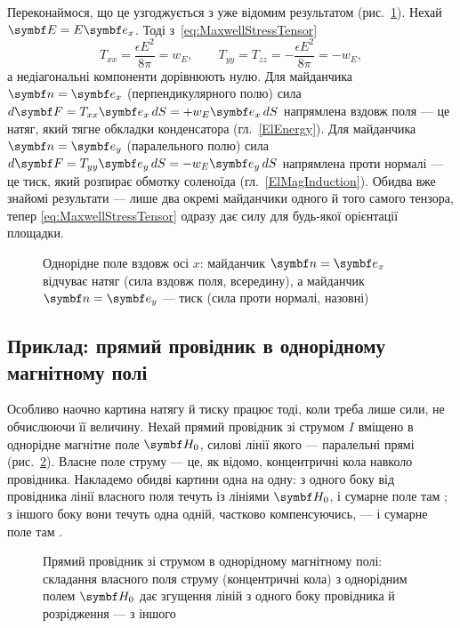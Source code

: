 \documentclass[]{ConspectBook}
\begin{document}
Переконаймося, що це узгоджується з уже відомим результатом (рис.~\ref{pic:StressDecoding}). Нехай $\Efield=E\vect e_x$. Тоді
з~\eqref{eq:MaxwellStressTensor}
\begin{equation*}
	T_{xx} = \frac{\epsilon E^2}{8\pi} = w_E, \qquad T_{yy}=T_{zz}=-\frac{\epsilon E^2}{8\pi}=-w_E,
\end{equation*}
а недіагональні компоненти дорівнюють нулю. Для майданчика $\vect n=\vect e_x$ (перпендикулярного полю) сила
$d\vect F=T_{xx}\vect e_x\,dS=+w_E\vect e_x\,dS$ напрямлена вздовж поля --- це натяг, який тягне обкладки конденсатора
(гл.~\ref{ElEnergy}). Для майданчика $\vect n=\vect e_y$ (паралельного полю) сила $d\vect F=T_{yy}\vect e_y\,dS=-w_E\vect e_y\,dS$ напрямлена
проти нормалі --- це тиск, який розпирає обмотку соленоїда (гл.~\ref{ElMagInduction}). Обидва вже знайомі результати --- лише два окремі
майданчики одного й того самого тензора, тепер \eqref{eq:MaxwellStressTensor} одразу дає силу для будь-якої орієнтації площадки.

\begin{figure}[h!]\centering
	\caption{Однорідне поле вздовж осі $x$: майданчик $\vect n=\vect e_x$ відчуває натяг (сила вздовж поля, всередину), а
		майданчик $\vect n=\vect e_y$ --- тиск (сила проти нормалі, назовні)\label{pic:StressDecoding}}
\end{figure}

\subsection*{Приклад: прямий провідник в однорідному магнітному полі}

Особливо наочно картина натягу й тиску працює тоді, коли треба лише  сили, не обчислюючи її величину. Нехай прямий
провідник зі струмом $I$ вміщено в однорідне магнітне поле $\Hfield_0$, силові лінії якого --- паралельні прямі (рис.~\ref{pic:WireInField}).
Власне поле струму --- це, як відомо, концентричні кола навколо провідника. Накладемо обидві картини одна на одну: з одного боку від провідника
лінії власного поля течуть  із лініями $\Hfield_0$, і сумарне поле там ; з іншого боку вони течуть
 одна одній, частково компенсуючись, --- і сумарне поле там .

\begin{figure}[h!]\centering
	\caption{Прямий провідник зі струмом в однорідному магнітному полі: складання власного поля струму (концентричні кола) з
		однорідним полем $\Hfield_0$ дає згущення ліній з одного боку провідника й розрідження --- з іншого\label{pic:WireInField}}
\end{figure}
\end{document}
